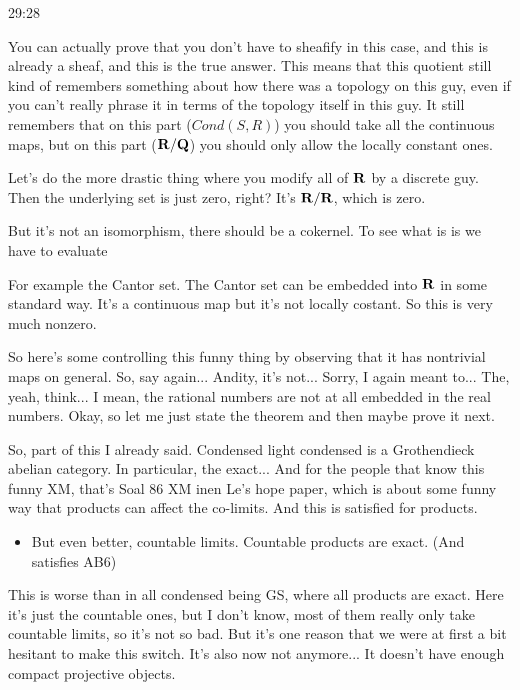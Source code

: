 \begin{example}
\begin{unfinished}{29:28}
\begin{remark}
\begin{remark}
\begin{example}
You can actually prove that you don't have to sheafify in this case, and this is already a sheaf, and this is the true answer. This means that this quotient still kind of remembers something about how there was a topology on this guy, even if you can't really phrase it in terms of the topology itself in this guy. It still remembers that on this part ($Cond(S,R)$) you should take all the continuous maps, but on this part ($\mathbf R/\mathbf Q$) you should only allow the locally constant ones.

Let's do the more drastic thing where you modify all of $\mathbf R$ by a discrete guy. Then the underlying set is just zero, right? It's $\mathbf R/\mathbf R$, which is zero.


But it's not an isomorphism, there should be a cokernel. To see what is is we have to evaluate


For example the Cantor set. The Cantor set can be embedded into $\mathbf R$ in some standard way. It's a continuous map but it's not locally costant. So this is very much nonzero.

So here's some controlling this funny thing by observing that it has nontrivial maps on general. So, say again... Andity, it's not... Sorry, I again meant to... The, yeah, think... I mean, the rational numbers are not at all embedded in the real numbers. Okay, so let me just state the theorem and then maybe prove it next.

\end{example}

So, part of this I already said. Condensed light condensed is a Grothendieck abelian category. In particular, the  exact...   And for the people that know this funny XM, that's Soal 86 XM inen Le's hope paper, which is about some funny way that products can affect the co-limits. And this is satisfied for products.

\begin{itemize}
\item But even better, countable limits. Countable products are exact. (And satisfies AB6)

\end{itemize}

This is worse than in all condensed being GS, where all products are exact. Here it's just the countable ones, but I don't know, most of them really only take countable limits, so it's not so bad. But it's one reason that we were at first a bit hesitant to make this switch. It's also now not anymore... It doesn't have enough compact projective objects.


\end{remark}
\end{remark}
\end{unfinished}
\end{example}
